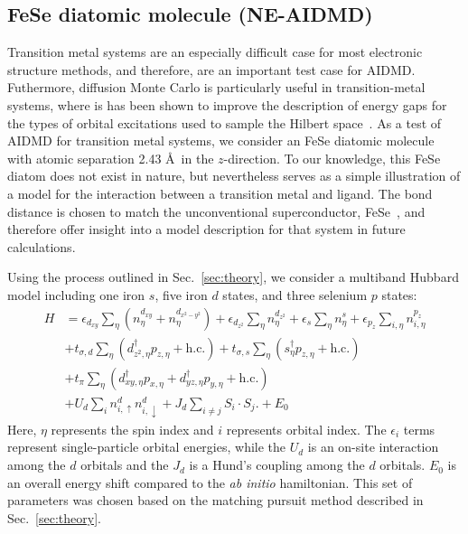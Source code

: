 \subsection{FeSe diatomic molecule (NE-AIDMD)}

Transition metal systems are an especially difficult case for most electronic structure methods, and therefore, are an 
important test case for AIDMD. Futhermore, diffusion Monte Carlo is particularly useful in transition-metal systems, where is has been shown to improve the description of energy gaps for the types of orbital excitations used to sample the Hilbert space~\cite{lucas}.
As a test of AIDMD for transition metal systems, we consider an FeSe diatomic molecule with atomic separation 2.43 \AA~in the $z$-direction.
To our knowledge, this FeSe diatom does not exist in nature, but nevertheless serves as a simple illustration of a model for the interaction between a transition metal and ligand.
The bond distance is chosen to match the unconventional superconductor, FeSe~\cite{fese}, and therefore offer insight into a model description for that system in future calculations.

Using the process outlined in Sec.~\ref{sec:theory}, we consider a multiband Hubbard model including one iron $s$, five iron $d$ states, and three selenium $p$ states:
\begin{align*}
  H 
  &=
  \epsilon_{d_{xy}} \sum_{\eta} (n^{d_{xy}}_{\eta}  + n^{d_{x^2-y^2}}_{\eta})
  +
  \epsilon_{d_{z^2}} \sum_{\eta} n^{d_{z^2}}_{\eta} 
  +
  \epsilon_s \sum_{\eta} n^{s}_{\eta} 
  +
  \epsilon_{p_{z}} \sum_{i,\eta} n^{p_{z}}_{i,\eta} 
  \\
  &+ 
  t_{\sigma,d} \sum_{\eta} \left( d_{z^2,\eta}^{\dagger} p_{z,\eta} + \text{h.c.} \right)
  +
  t_{\sigma,s} \sum_{\eta} \left(s_{\eta}^{\dagger}  p_{z,\eta} + \text{h.c.} \right)
  \\
  &+ 
  t_{\pi} \sum_{\eta} \left( d_{xy,\eta}^{\dagger} p_{x,\eta} + d_{yz,\eta}^{\dagger}  p_{y,\eta} + \text{h.c.} \right)
  \\
  &+
  U_d \sum_{i} n^{d}_{i,\uparrow} n^{d}_{i,\downarrow} 
  +
  J_d \sum_{i\ne j} S_i \cdot S_j.
  +
  E_0
\end{align*}
Here, $\eta$ represents the spin index and $i$ represents orbital index.
The $\epsilon_i$ terms represent single-particle orbital energies, while the $U_d$ is an on-site interaction among the $d$ orbitals and the $J_d$ is a Hund's coupling among the $d$ orbitals.
$E_0$ is an overall energy shift compared to the \textit{ab initio} hamiltonian.
This set of parameters was chosen based on the matching pursuit method described in Sec.~\ref{sec:theory}.

